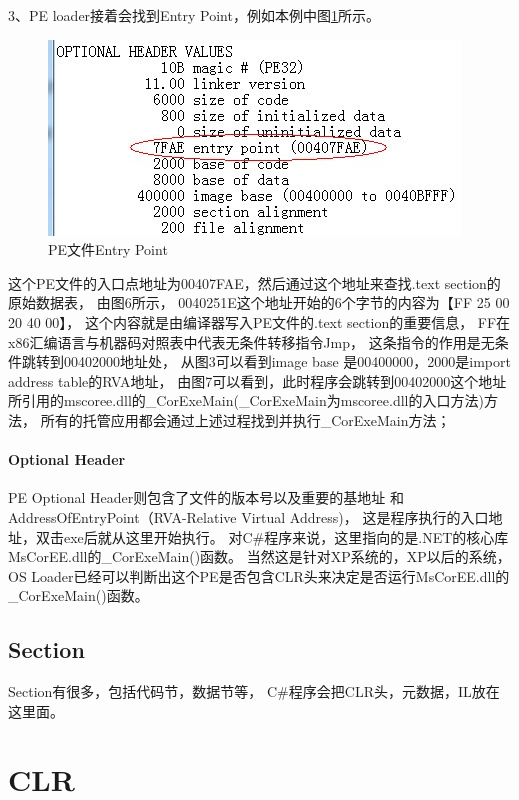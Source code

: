 \documentclass{book}
\begin{document}
3、PE loader接着会找到Entry Point，例如本例中图\ref{fig:PEFileEntryPoint}所示。

\begin{figure}[htbp]
	\centering
	\includegraphics[scale=0.8]{PEFileEntryPoint.jpg}
	\caption{PE文件Entry Point}
	\label{fig:PEFileEntryPoint}
\end{figure}

这个PE文件的入口点地址为00407FAE，然后通过这个地址来查找.text section的原始数据表，
由图6所示，
0040251E这个地址开始的6个字节的内容为【FF 25 00 20 40 00】，
这个内容就是由编译器写入PE文件的.text section的重要信息，
FF在x86汇编语言与机器码对照表中代表无条件转移指令Jmp，
这条指令的作用是无条件跳转到00402000地址处，
从图3可以看到image base 是00400000，2000是import address table的RVA地址，
由图7可以看到，此时程序会跳转到00402000这个地址所引用的mscoree.dll的\_CorExeMain(\_CorExeMain为mscoree.dll的入口方法)方法，
所有的托管应用都会通过上述过程找到并执行\_CorExeMain方法；

\paragraph{Optional Header}PE Optional Header则包含了文件的版本号以及重要的基地址
和AddressOfEntryPoint（RVA-Relative Virtual Address)，
这是程序执行的入口地址，双击exe后就从这里开始执行。
对C\#程序来说，这里指向的是.NET的核心库MsCorEE.dll的\_CorExeMain()函数。
当然这是针对XP系统的，XP以后的系统，
OS Loader已经可以判断出这个PE是否包含CLR头来决定是否运行MsCorEE.dll的\_CorExeMain()函数。

\subsection{Section}Section有很多，包括代码节，数据节等，
C\#程序会把CLR头，元数据，IL放在这里面。

\section{CLR}
\end{document}
